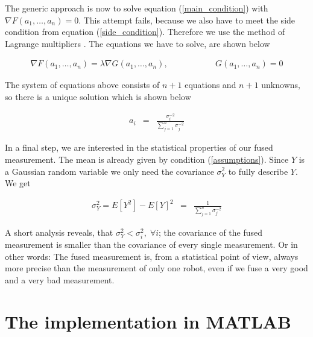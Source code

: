 The generic approach is now to solve equation (\ref{main_condition}) with \(\nabla F(a_1,\ldots,a_n) = 0\). This attempt fails, because we also have to meet the side condition from equation (\ref{side_condition}). Therefore we use the method of Lagrange multipliers \cite{Blatter}. The equations we have to solve, are shown below

\begin{enumerate}
	\begin{eqnarray}\label{lagrange_multipliers}
    			 \nabla F(a_1,\ldots,a_n) = \lambda \nabla G(a_1,\ldots,a_n), \qquad && \qquad G(a_1,\ldots,a_n) = 0
	\end{eqnarray}
\end{enumerate}

The system of equations above consists of \(n+1\) equations and \(n+1\) unknowns, so there is a unique solution which is shown below

\begin{enumerate}
	\begin{eqnarray}\label{solution}
    			 a_i &=& \frac{\sigma_i^{-2}}{\sum_{j=1}^n \sigma_j^{-2}}
	\end{eqnarray}
\end{enumerate}

In a final step, we are interested in the statistical properties of our fused measurement. The mean is already given by condition (\ref{assumptions}). Since \(Y\) is a Gaussian random variable we only need the covariance \(\sigma_Y^2\) to fully describe \(Y\). We get

\begin{enumerate}
	\begin{eqnarray}\label{solution}
    			 \sigma_Y^2 = E\left[ Y^2 \right] - E[Y]^2 &=& \frac{1}{\sum_{j=1}^n \sigma_j^{-2}}
	\end{eqnarray}
\end{enumerate}

A short analysis reveals, that \(\sigma_Y^2 < \sigma_i^2, \; \forall i\); the covariance of the fused measurement is smaller than the covariance of every single measurement. Or in other words: The fused measurement is, from a statistical point of view, always more precise than the measurement of only one robot, even if we fuse a very good and a very bad measurement.


\section{The implementation in MATLAB}

